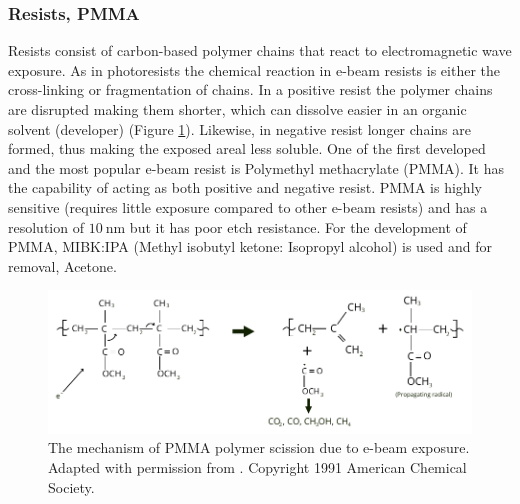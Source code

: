 \documentclass[final]{jyflluk}
\begin{document}
\subsubsection{Resists, PMMA}

Resists consist of carbon-based polymer chains that react to electromagnetic wave exposure. As in photoresists the chemical reaction in e-beam resists is either the cross-linking or fragmentation of chains. In a positive resist the polymer chains are disrupted making them shorter, which can dissolve easier in an organic solvent (developer) (Figure \ref{fig:PMMA_chem}). Likewise, in negative resist longer chains are formed, thus making the exposed areal less soluble. One of the first developed and the most popular e-beam resist is Polymethyl methacrylate (PMMA). It has the capability of acting as both positive and negative resist. PMMA is highly sensitive (requires little exposure compared to other e-beam resists) and has a resolution of $\SI{10}{\nano \metre}$ but it has poor etch resistance. For the development of PMMA, MIBK:IPA (Methyl isobutyl ketone: Isopropyl alcohol) is used and for removal, Acetone. \cite{EBL_GOOD}

\begin{figure}[h]
    \centering
    \includegraphics[width=1.0\textwidth]{images/PMMA_chem_eq.pdf}
    \caption{The mechanism of PMMA polymer scission due to e-beam exposure. Adapted with permission from \cite{moore_degradation_1991}. Copyright 1991 American Chemical Society.}
    \label{fig:PMMA_chem}
\end{figure}
\end{document}
